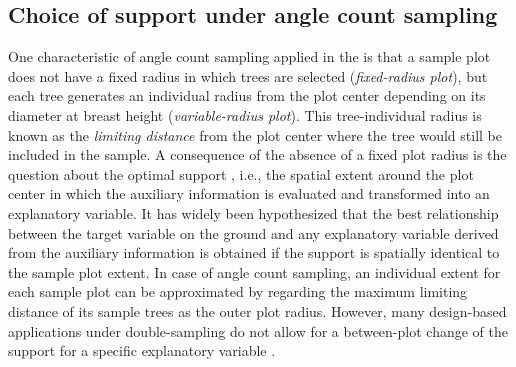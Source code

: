 \subsection{Choice of support under angle count sampling}
\label{sec:supp}

One characteristic of angle count sampling applied in the \bwi{} is that a sample plot does not have a fixed radius in which trees are selected (\textit{fixed-radius plot}), but each tree generates an individual radius from the plot center depending on its diameter at breast height (\textit{variable-radius plot}). This tree-individual radius is known as the \textit{limiting distance} from the plot center where the tree would still be included in the sample. A consequence of the absence of a fixed plot radius is the question about the optimal support \citep{hollaus2007}, i.e., the spatial extent around the plot center in which the auxiliary information is evaluated and transformed into an explanatory variable. It has widely been hypothesized that the best relationship between the target variable on the ground and any explanatory variable derived from the auxiliary information is obtained if the support is spatially identical to the sample plot extent. In case of angle count sampling, an individual extent for each sample plot can be approximated by regarding the maximum limiting distance of its sample trees as the outer plot radius. However, many design-based applications under double-sampling do not allow for a between-plot change of the support for a specific explanatory variable \citep{mandallaz2013c, mandallaz2013a}.\par
